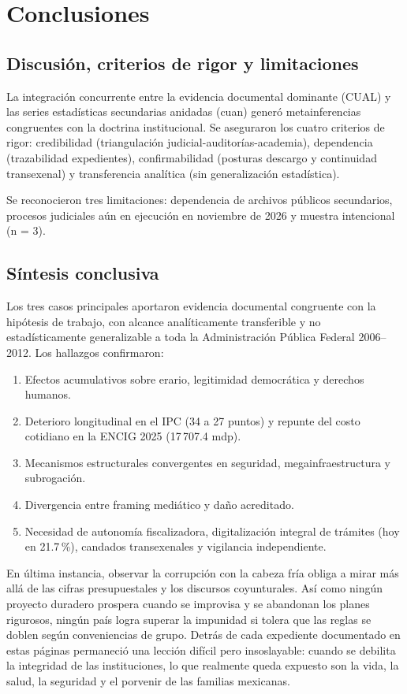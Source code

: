 \documentclass[12pt,letterpaper,oneside]{article}
\begin{document}
\section{Conclusiones}

\subsection{Discusión, criterios de rigor y limitaciones}

La integración concurrente entre la evidencia documental dominante (CUAL) y las series estadísticas secundarias anidadas (cuan) generó metainferencias congruentes con la doctrina institucional. Se aseguraron los cuatro criterios de rigor: credibilidad (triangulación judicial-auditorías-academia), dependencia (trazabilidad expedientes), confirmabilidad (posturas descargo y continuidad transexenal) y transferencia analítica (sin generalización estadística).

Se reconocieron tres limitaciones: dependencia de archivos públicos secundarios, procesos judiciales aún en ejecución en noviembre de 2026 y muestra intencional (n = 3).

\subsection{Síntesis conclusiva}

Los tres casos principales aportaron evidencia documental congruente con la hipótesis de trabajo, con alcance analíticamente transferible y no estadísticamente generalizable a toda la Administración Pública Federal 2006--2012. Los hallazgos confirmaron:

\begin{enumerate}
  \item Efectos acumulativos sobre erario, legitimidad democrática y derechos humanos.
  \item Deterioro longitudinal en el IPC (34 a 27 puntos) y repunte del costo cotidiano en la ENCIG 2025 (17\,707.4 mdp).
  \item Mecanismos estructurales convergentes en seguridad, megainfraestructura y subrogación.
  \item Divergencia entre framing mediático y daño acreditado.
  \item Necesidad de autonomía fiscalizadora, digitalización integral de trámites (hoy en 21.7\,\%), candados transexenales y vigilancia independiente.
\end{enumerate}

En última instancia, observar la corrupción con la cabeza fría obliga a mirar más allá de las cifras presupuestales y los discursos coyunturales. Así como ningún proyecto duradero prospera cuando se improvisa y se abandonan los planes rigurosos, ningún país logra superar la impunidad si tolera que las reglas se doblen según conveniencias de grupo. Detrás de cada expediente documentado en estas páginas permaneció una lección difícil pero insoslayable: cuando se debilita la integridad de las instituciones, lo que realmente queda expuesto son la vida, la salud, la seguridad y el porvenir de las familias mexicanas.
\end{document}
